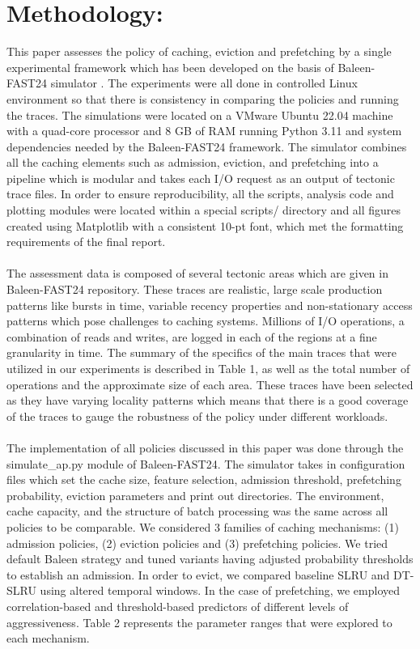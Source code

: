 \documentclass[sigconf]{acmart}
\begin{document}
{\section{Methodology:}
\large This paper assesses the policy of caching, eviction and prefetching by a single experimental framework which has been developed on the basis of Baleen-FAST24 simulator \cite{baleen_artifact}. The experiments were all done in controlled Linux environment so that there is consistency in comparing the policies and running the traces. The simulations were located on a VMware Ubuntu 22.04 machine with a quad-core processor and 8 GB of RAM running Python 3.11 and system dependencies needed by the Baleen-FAST24 framework. The simulator combines all the caching elements such as admission, eviction, and prefetching into a pipeline which is modular and takes each I/O request as an output of tectonic trace files. In order to ensure reproducibility, all the scripts, analysis code and plotting modules were located within a special scripts/ directory and all figures created using Matplotlib with a consistent 10-pt font, which met the formatting requirements of the final report.\\
\\The assessment data is composed of several tectonic areas which are given in Baleen-FAST24 repository. These traces are realistic, large scale production patterns like bursts in time, variable recency properties and non-stationary access patterns which pose challenges to caching systems. Millions of I/O operations, a combination of reads and writes, are logged in each of the regions at a fine granularity in time. The summary of the specifics of the main traces that were utilized in our experiments is described in Table 1, as well as the total number of operations and the approximate size of each area. These traces have been selected as they have varying locality patterns which means that there is a good coverage of the traces to gauge the robustness of the policy under different workloads.\\
\\The implementation of all policies discussed in this paper was done through the simulate\_ap.py module of Baleen-FAST24. The simulator takes in configuration files which set the cache size, feature selection, admission threshold, prefetching probability, eviction parameters and print out directories. The environment, cache capacity, and the structure of batch processing was the same across all policies to be comparable. We considered 3 families of caching mechanisms: (1) admission policies, (2) eviction policies and (3) prefetching policies. We tried default Baleen strategy and tuned variants having adjusted probability thresholds to establish an admission. In order to evict, we compared baseline SLRU and DT-SLRU using altered temporal windows. In the case of prefetching, we employed correlation-based and threshold-based predictors of different levels of aggressiveness. Table 2 represents the parameter ranges that were explored to each mechanism.\\
}
\end{document}
